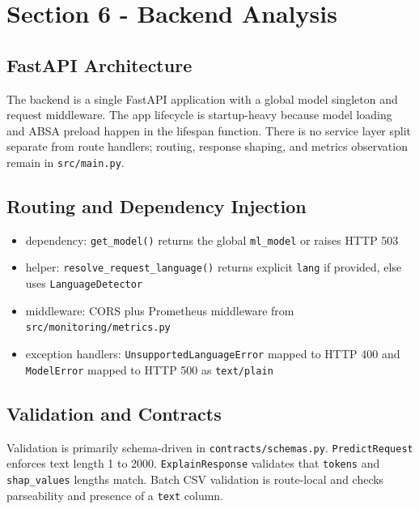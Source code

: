 \section{Section 6 - Backend Analysis}
\subsection{FastAPI Architecture}
The backend is a single FastAPI application with a global model singleton and request middleware. The app lifecycle is startup-heavy because model loading and ABSA preload happen in the lifespan function. There is no service layer split separate from route handlers; routing, response shaping, and metrics observation remain in \texttt{src/main.py}.

\subsection{Routing and Dependency Injection}
\begin{itemize}[leftmargin=1.2em]
  \item dependency: \texttt{get\_model()} returns the global \texttt{ml\_model} or raises HTTP 503
  \item helper: \texttt{resolve\_request\_language()} returns explicit \texttt{lang} if provided, else uses \texttt{LanguageDetector}
  \item middleware: CORS plus Prometheus middleware from \texttt{src/monitoring/metrics.py}
  \item exception handlers: \texttt{UnsupportedLanguageError} mapped to HTTP 400 and \texttt{ModelError} mapped to HTTP 500 as \texttt{text/plain}
\end{itemize}

\subsection{Validation and Contracts}
Validation is primarily schema-driven in \texttt{contracts/schemas.py}. \texttt{PredictRequest} enforces text length 1 to 2000. \texttt{ExplainResponse} validates that \texttt{tokens} and \texttt{shap\_values} lengths match. Batch CSV validation is route-local and checks parseability and presence of a \texttt{text} column.

